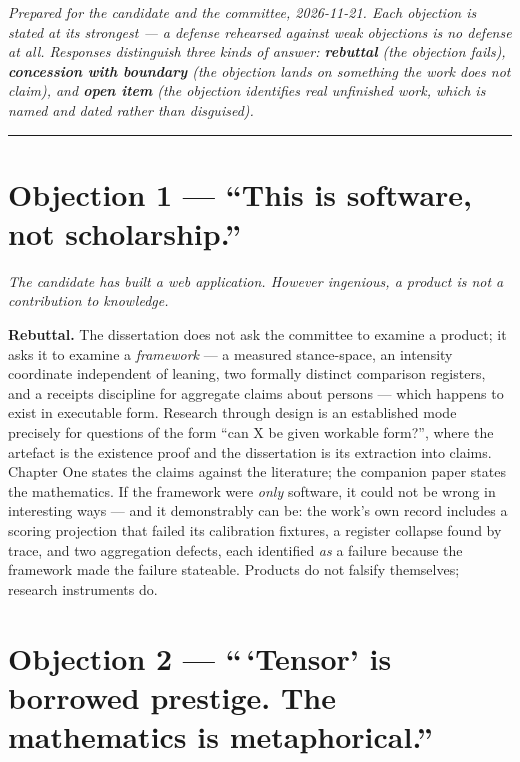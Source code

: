 \emph{Prepared for the candidate and the committee, 2026-11-21. Each
objection is stated at its strongest --- a defense rehearsed against
weak objections is no defense at all. Responses distinguish three kinds
of answer: \textbf{rebuttal} (the objection fails), \textbf{concession
with boundary} (the objection lands on something the work does not
claim), and \textbf{open item} (the objection identifies real unfinished
work, which is named and dated rather than disguised).}

\begin{center}\rule{0.5\linewidth}{0.5pt}\end{center}

\section{Objection 1 --- ``This is software, not
scholarship.''}\label{objection-1-this-is-software-not-scholarship.}

\emph{The candidate has built a web application. However ingenious, a
product is not a contribution to knowledge.}

\textbf{Rebuttal.} The dissertation does not ask the committee to
examine a product; it asks it to examine a \emph{framework} --- a
measured stance-space, an intensity coordinate independent of leaning,
two formally distinct comparison registers, and a receipts discipline
for aggregate claims about persons --- which happens to exist in
executable form. Research through design is an established mode
precisely for questions of the form ``can X be given workable form?'',
where the artefact is the existence proof and the dissertation is its
extraction into claims. Chapter One states the claims against the
literature; the companion paper states the mathematics. If the framework
were \emph{only} software, it could not be wrong in interesting ways ---
and it demonstrably can be: the work's own record includes a scoring
projection that failed its calibration fixtures, a register collapse
found by trace, and two aggregation defects, each identified \emph{as} a
failure because the framework made the failure stateable. Products do
not falsify themselves; research instruments do.

\section{Objection 2 --- ``\,`Tensor' is borrowed prestige. The
mathematics is
metaphorical.''}\label{objection-2-tensor-is-borrowed-prestige.-the-mathematics-is-metaphorical.}

